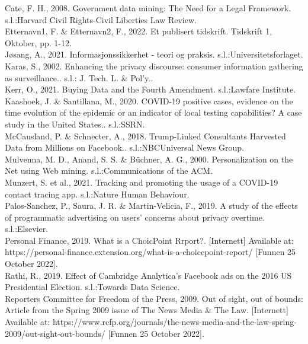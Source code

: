 \documentclass[11pt]{article}
\begin{document}
Cate, F. H., 2008. Government data mining: The Need for a Legal Framework. s.l.:Harvard Civil Rights-Civil Liberties Law Review. \\

Etternavn1, F. \& Etternavn2, F., 2022. Et publisert tidskrift. Tidskrift 1, Oktober, pp. 1-12. \\

Jøsang, A., 2021. Informasjonssikkerhet - teori og praksis. s.l.:Universitetsforlaget. \\

Karas, S., 2002. Enhancing the privacy discourse: consumer information gathering as surveillance.. s.l.: J. Tech. L. \& Pol'y.. \\

Kerr, O., 2021. Buying Data and the Fourth Amendment. s.l.:Lawfare Institute. \\

Kaashoek, J. \& Santillana, M., 2020. COVID-19 positive cases, evidence on the time evolution of the epidemic or an indicator of local testing capabilities? A case study in the United States.. s.l.:SSRN. \\

McCausland, P. \& Schnecter, A., 2018. Trump-Linked Consultants Harvested Data from Millions on Facebook.. s.l.:NBCUniversal News Group. \\

Mulvenna, M. D., Anand, S. S. \& Büchner, A. G., 2000. Personalization on the Net using Web mining. s.l.:Communications of the ACM. \\

Munzert, S. et al., 2021. Tracking and promoting the usage of a COVID-19 contact tracing app. s.l.:Nature Human Behaviour. \\

Palos-Sanchez, P., Saura, J. R. \& Martin-Velicia, F., 2019. A study of the effects of programmatic advertising on users' concerns about privacy overtime. s.l.:Elsevier. \\

Personal Finance, 2019. What is a ChoicPoint Rrport?. [Internett]  
Available at: https://personal-finance.extension.org/what-is-a-choicepoint-report/ 
[Funnen 25 October 2022]. \\

Rathi, R., 2019. Effect of Cambridge Analytica’s Facebook ads on the 2016 US Presidential Election. s.l.:Towards Data Science. \\

Reporters Committee for Freedom of the Press, 2009. Out of sight, out of bounds: Article from the Spring 2009 issue of The News Media \& The Law. [Internett]  
Available at: https://www.rcfp.org/journals/the-news-media-and-the-law-spring-2009/out-sight-out-bounds/ 
[Funnen 25 October 2022]. \\
\end{document}
